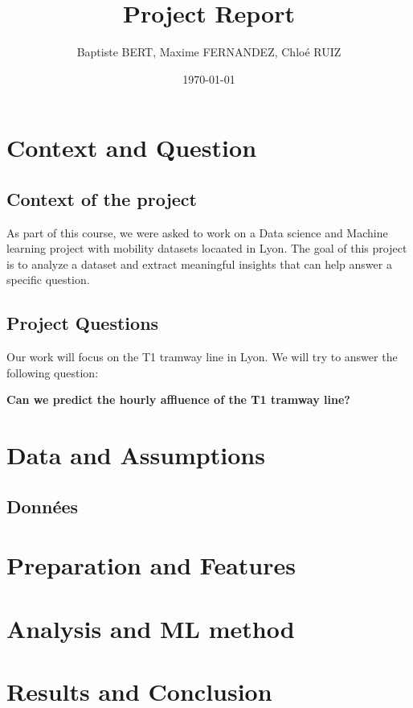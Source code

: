 \documentclass[11pt,a4paper]{report}
\title{Project Report}
\author{Baptiste BERT, Maxime FERNANDEZ, Chloé RUIZ}
\date{\today}
\begin{document}
\maketitle
\tableofcontents

\chapter{Context and Question}
\section{Context of the project}
As part of this course, we were asked to work on a Data science and Machine learning project
with mobility datasets locaated in Lyon.
The goal of this project is to analyze a dataset and extract meaningful insights that can help answer a specific question.

\section{Project Questions}
Our work will focus on the T1 tramway line in Lyon. We will try to answer the following question:
\begin{center}
    \textbf{Can we predict the hourly affluence of the T1 tramway line?}
\end{center}

\chapter{Data and Assumptions}
\section{Données}

\chapter{Preparation and Features}

\chapter{Analysis and ML method}

\chapter{Results and Conclusion}
\end{document}
